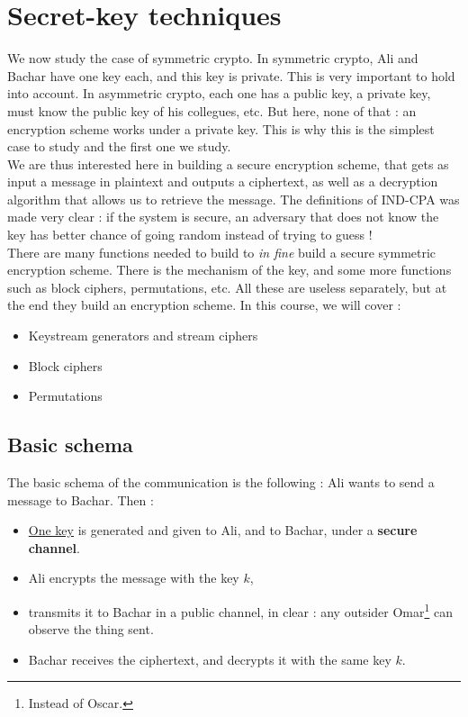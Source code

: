 \documentclass[../Cryptography.tex]{subfiles}
\begin{document}
\chapter{Secret-key techniques}
We now study the case of symmetric crypto. In symmetric crypto, Ali and Bachar have one key each, and this key is private. This is very important to hold into account. In asymmetric crypto, each one has a public key, a private key, must know the public key of his collegues, etc. But here, none of that : an encryption scheme works under a private key. This is why this is the simplest case to study and the first one we study. \\

We are thus interested here in building a secure encryption scheme, that gets as input a message in plaintext and outputs a ciphertext, as well as a decryption algorithm that allows us to retrieve the message. The definitions of IND-CPA was made very clear : if the system is secure, an adversary that does not know the key has better chance of going random instead of trying to guess ! \\

There are many functions needed to build to \textit{in fine} build a secure symmetric encryption scheme. There is the mechanism of the key, and some more functions such as block ciphers, permutations, etc. All these are useless separately, but at the end they build an encryption scheme. In this course, we will cover :
\begin{itemize}
    \item Keystream generators and stream ciphers
    \item Block ciphers
    \item Permutations
\end{itemize}

\section{Basic schema}
The basic schema of the communication is the following : Ali wants to send a message to Bachar. Then :
\begin{itemize}
    \item \underline{One key} is generated and given to Ali, and to Bachar, under a \textbf{secure channel}.
    \item Ali encrypts the message with the key $k$,
    \item transmits it to Bachar in a public channel, in clear : any outsider Omar\footnote{Instead of Oscar.} can observe the thing sent.
    \item Bachar receives the ciphertext, and decrypts it with the same key $k$.
\end{itemize}
\end{document}
